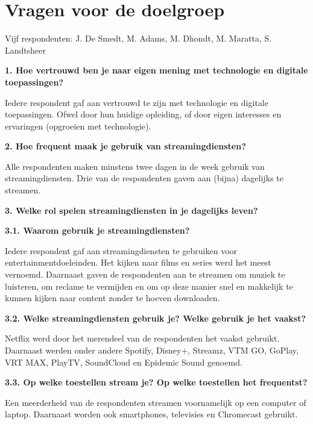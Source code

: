 \section{Vragen voor de doelgroep}
\label{sec:interviews-doelgroep}

Vijf respondenten: J. De Smedt, M. Adams, M. Dhondt, M. Maratta, S. Landtsheer

\vspace{1em}

\textbf{1. Hoe vertrouwd ben je naar eigen mening met technologie en digitale toepassingen?}

Iedere respondent gaf aan vertrouwd te zijn met technologie en digitale toepassingen. Ofwel door hun huidige opleiding, of door eigen interesses en ervaringen (opgroeien met technologie).

\vspace{1em}

\textbf{2. Hoe frequent maak je gebruik van streamingdiensten?}

Alle respondenten maken minstens twee dagen in de week gebruik van streamingdiensten. Drie van de respondenten gaven aan (bijna) dagelijks te streamen.

\vspace{1em}

\textbf{3. Welke rol spelen streamingdiensten in je dagelijks leven?}

\textbf{3.1. Waarom gebruik je streamingdiensten?}

Iedere respondent gaf aan streamingdiensten te gebruiken voor entertainmentdoeleinden. Het kijken naar films en series werd het meest vernoemd. Daarnaast gaven de respondenten aan te streamen om muziek te luisteren, om reclame te vermijden en om op deze manier snel en makkelijk te kunnen kijken naar content zonder te hoeven downloaden.

\newpage

\textbf{3.2. Welke streamingdiensten gebruik je? Welke gebruik je het vaakst?}

Netflix werd door het merendeel van de respondenten het vaakst gebruikt. Daarnaast werden onder andere Spotify, Disney+, Streamz, VTM GO, GoPlay, VRT MAX, PlayTV, SoundCloud en Epidemic Sound genoemd.

\vspace{1em}

\textbf{3.3. Op welke toestellen stream je? Op welke toestellen het frequentst?}

Een meerderheid van de respondenten streamen voornamelijk op een computer of laptop. Daarnaast worden ook smartphones, televisies en Chromecast gebruikt.

